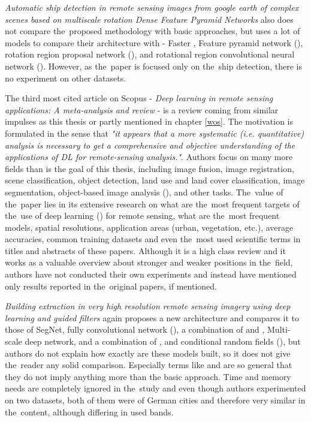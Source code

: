 \textit{Automatic ship detection in remote sensing images from google earth of complex scenes based on multiscale rotation Dense Feature Pyramid Networks} also does not compare the~proposed methodology with basic  approaches, but uses a lot of  models to compare their architecture with - Faster , Feature pyramid network (), rotation region proposal network (), and rotational region convolutional neural network (). However, as the~paper is focused only on the~ship detection, there is no experiment on other datasets.

The third most cited article on Scopus - \textit{Deep learning in remote sensing applications: A meta-analysis and review} - is a review coming from similar impulses as this thesis or partly \cite{landslide-evaluation} mentioned in chapter \ref{wos}. The motivation is formulated in the sense that \textit{"it appears that a more systematic (i.e. quantitative) analysis is necessary to get a comprehensive and objective understanding of the applications of DL for remote-sensing analysis."}. Authors focus on many more fields than is the goal of this thesis, including image fusion, image registration, scene classification, object detection, land use and land cover classification, image segmentation, object-based image analysis (), and other tasks. The~value of the~paper lies in its extensive research on what are the~most frequent targets of the~use of deep learning () for remote sensing, what are the~most frequent  models, spatial resolutions, application areas (urban, vegetation, etc.), average accuracies, common training datasets and even the~most used scientific terms in titles and abstracts of these papers. Although it is a high class review and it works as a valuable overview about  stronger and weaker positions in the~field, authors have not conducted their own experiments and instead have mentioned only results reported in the~original papers, if mentioned.

\textit{Building extraction in very high resolution remote sensing imagery using deep learning and guided filters} again proposes a new architecture and compares it to those of SegNet, fully convolutional network (), a combination of  and , Multi-scale deep network, and a combination of ,  and conditional random fields (), but authors do not explain how exactly are these models built, so it does not give the~reader any solid comparison. Especially terms like  and  are so general that they do not imply anything more than the basic approach. Time and memory needs are completely ignored in the~study and even though authors experimented on two datasets, both of them were of German cities and therefore very similar in the~content, although differing in used bands.

